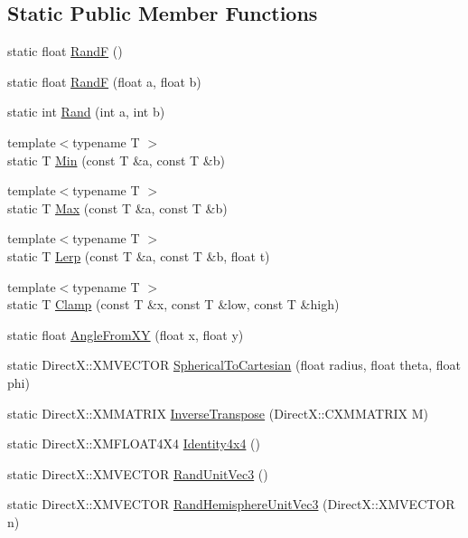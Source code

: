 \subsection*{Static Public Member Functions}
\begin{DoxyCompactItemize}
\item 
static float \hyperlink{class_math_helper_ad50130c776aee103e24d7170adcd13a3_ad50130c776aee103e24d7170adcd13a3}{RandF} ()
\item 
static float \hyperlink{class_math_helper_a5b45a90302f9791a4961d943d473d6bb_a5b45a90302f9791a4961d943d473d6bb}{RandF} (float a, float b)
\item 
static int \hyperlink{class_math_helper_ab957edc5bcaf8d4966a1fde0e7c5fe38_ab957edc5bcaf8d4966a1fde0e7c5fe38}{Rand} (int a, int b)
\item 
{\footnotesize template$<$typename T $>$ }\\static T \hyperlink{class_math_helper_a5609539d1b530660438b48c74af2e1f4_a5609539d1b530660438b48c74af2e1f4}{Min} (const T \&a, const T \&b)
\item 
{\footnotesize template$<$typename T $>$ }\\static T \hyperlink{class_math_helper_a0c33d72533f7bb85d56ab384e6867771_a0c33d72533f7bb85d56ab384e6867771}{Max} (const T \&a, const T \&b)
\item 
{\footnotesize template$<$typename T $>$ }\\static T \hyperlink{class_math_helper_a1dfdb08dbd787c42bc5a42f41dd9b64c_a1dfdb08dbd787c42bc5a42f41dd9b64c}{Lerp} (const T \&a, const T \&b, float t)
\item 
{\footnotesize template$<$typename T $>$ }\\static T \hyperlink{class_math_helper_af659fe642c374ff42247e25e887ae816_af659fe642c374ff42247e25e887ae816}{Clamp} (const T \&x, const T \&low, const T \&high)
\item 
static float \hyperlink{class_math_helper_a44b4f8f5faf51c790c87ebb7c2fc5c1e_a44b4f8f5faf51c790c87ebb7c2fc5c1e}{Angle\+From\+XY} (float x, float y)
\item 
static Direct\+X\+::\+X\+M\+V\+E\+C\+T\+OR \hyperlink{class_math_helper_a592137b14c704600422afa7654f0d441_a592137b14c704600422afa7654f0d441}{Spherical\+To\+Cartesian} (float radius, float theta, float phi)
\item 
static Direct\+X\+::\+X\+M\+M\+A\+T\+R\+IX \hyperlink{class_math_helper_aaad3761266ef094f5448993a8b2992a5_aaad3761266ef094f5448993a8b2992a5}{Inverse\+Transpose} (Direct\+X\+::\+C\+X\+M\+M\+A\+T\+R\+IX M)
\item 
static Direct\+X\+::\+X\+M\+F\+L\+O\+A\+T4\+X4 \hyperlink{class_math_helper_a68b4e9af95b1a36aad30ea80839f6b19_a68b4e9af95b1a36aad30ea80839f6b19}{Identity4x4} ()
\item 
static Direct\+X\+::\+X\+M\+V\+E\+C\+T\+OR \hyperlink{class_math_helper_ad28ffa12ec507b33bd45dd3a842173a6_ad28ffa12ec507b33bd45dd3a842173a6}{Rand\+Unit\+Vec3} ()
\item 
static Direct\+X\+::\+X\+M\+V\+E\+C\+T\+OR \hyperlink{class_math_helper_a1b8d2df0e81ec45673de09642351119d_a1b8d2df0e81ec45673de09642351119d}{Rand\+Hemisphere\+Unit\+Vec3} (Direct\+X\+::\+X\+M\+V\+E\+C\+T\+OR n)
\end{DoxyCompactItemize}
